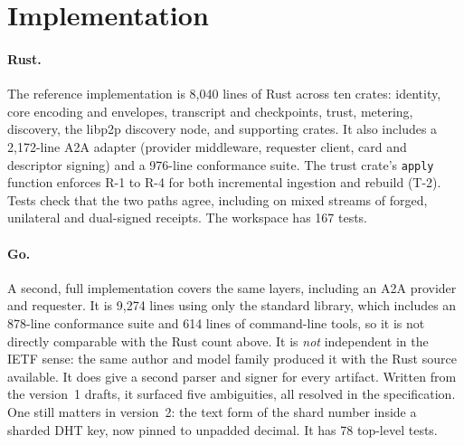 \section{Implementation}
\label{sec:implementation}

\paragraph{Rust.}
The reference implementation is 8,040 lines of Rust across ten crates:
identity, core encoding and envelopes, transcript and checkpoints, trust,
metering, discovery, the libp2p discovery node, and supporting crates.
It also includes a 2,172-line A2A adapter (provider middleware, requester
client, card and descriptor signing) and a 976-line conformance suite.
The trust crate's \texttt{apply} function enforces R-1 to R-4 for both
incremental ingestion and rebuild (T-2). Tests check that the two paths
agree, including on mixed streams of forged, unilateral and dual-signed
receipts. The workspace has 167 tests.

\paragraph{Go.}
A second, full implementation covers
the same layers, including an A2A provider and requester. It is 9,274
lines using only the standard library, which includes an 878-line
conformance suite and 614 lines of command-line tools, so it is not
directly comparable with the Rust count above. It is
\emph{not} independent in the IETF sense: the same author and model
family produced it with the Rust source available. It does give a second parser and signer for
every artifact. Written from the version~1 drafts, it surfaced five
ambiguities, all resolved in the specification. One still matters in
version~2: the text form of the shard number inside a sharded DHT key,
now pinned to unpadded decimal. It has 78 top-level tests.

